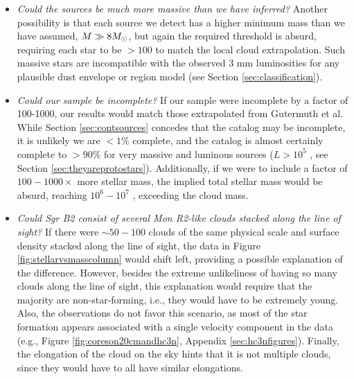 \documentclass[twocolumn]{aastex61}
\begin{document}
\begin{itemize}
    \item \emph{Could the sources be much more massive than we have inferred?}
        Another possibility is that each source we detect has a higher minimum
        mass than we have assumed, $M\gg8 M_{\odot}$, but again the required
        threshold is absurd, requiring each star to be $>100$ \msun to match
        the local cloud extrapolation.  Such massive stars are incompatible
        with the observed 3 mm luminosities for any plausible dust envelope
        or \hii region model (see Section \ref{sec:classification}).

    \item \emph{Could our sample be incomplete?}
        If our sample were incomplete by a factor of 100-1000, our results
        would match those extrapolated from Gutermuth et al.  While Section
        \ref{sec:contsources} concedes that the catalog may be incomplete, it
        is unlikely we are $<1\%$ complete, and the catalog is almost certainly
        complete to $>90\%$ for very massive and luminous sources ($L>10^5$
        \lsun, see Section \ref{sec:theyareprotostars}).  Additionally, if
        we were to include a factor of $100-1000\times$ more stellar mass, the 
        implied total stellar mass would be absurd, reaching $10^6-10^7$ \msun,
        exceeding the cloud mass.

    \item \emph{Could Sgr B2 consist of several Mon R2-like clouds stacked
        along the line of sight?}
        If there were $\sim50-100$ clouds of the same physical scale and
        surface density stacked along the line of sight, the data in Figure
        \ref{fig:stellarvsmasscolumn} would shift left, providing a possible
        explanation of the difference.  However, besides the extreme
        unlikeliness of having so many clouds along the line of sight, this
        explanation would require that the majority are non-star-forming, i.e.,
        they would have to be extremely young.  Also, the observations do not
        favor this scenario, as most of the star formation appears associated
        with a single velocity component in the \cyanoacetylene data (e.g., 
        Figure \ref{fig:coreson20cmandhc3n}, Appendix \ref{sec:hc3nfigures}).
        Finally, the elongation of the cloud on the sky hints that it is not
        multiple clouds, since they would have to all have similar elongations.


\end{itemize}
\end{document}
